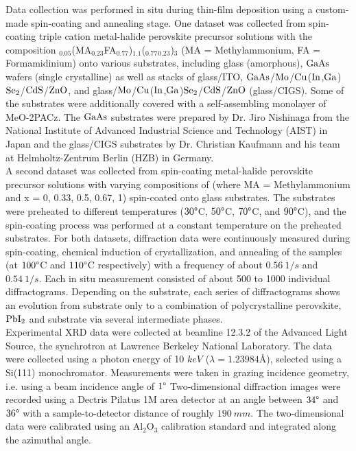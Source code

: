 Data collection was performed in situ during thin-film deposition using a custom-made spin-coating and annealing stage. One dataset was collected from spin-coating triple cation metal-halide perovskite precursor solutions with the composition 
$_{0.05}$(MA$_{0.23}$FA$_{0.77}$)$_{1.1}$($_{0.77}$$_{0.23}$)$_{3}$ (MA = Methylammonium, FA = Formamidinium) onto various substrates, including glass (amorphous), $\ce{GaAs}$ wafers (single crystalline) as well as stacks of glass/ITO, $\ce{GaAs}$/$\ce{Mo}$/$\ce{Cu}$($\ce{In}$,$\ce{Ga}$)$\ce{Se2}$/$\ce{CdS}$/$\ce{ZnO}$, and glass/$\ce{Mo}$/$\ce{Cu}$($\ce{In}$,$\ce{Ga}$)$\ce{Se2}$/$\ce{CdS}$/$\ce{ZnO}$ (glass/CIGS). Some of the substrates were additionally covered with a self-assembling monolayer of MeO-2PACz. The $\ce{GaAs}$ substrates were prepared by Dr. Jiro Nishinaga from the National Institute of Advanced Industrial Science and Technology (AIST) in Japan and the glass/CIGS substrates by Dr. Christian Kaufmann and his team at Helmholtz-Zentrum Berlin (HZB) in Germany. \\

A second dataset was collected from spin-coating metal-halide perovskite precursor solutions with varying compositions of  (where MA = Methylammonium and x = 0, 0.33, 0.5, 0.67, 1) spin-coated onto glass substrates. The substrates were preheated to different temperatures ($30\degree $C, $50\degree $C, $70\degree $C, and $90\degree $C), and the spin-coating process was performed at a constant temperature on the preheated substrates. For both datasets, diffraction data were continuously measured during spin-coating, chemical induction of crystallization, and annealing of the samples (at $100\degree$C and $110\degree$C respectively) with a frequency of about $0.56 
 \ 1/\si{s}$ and $0.54 \ 1/\si{s}$. Each in situ measurement consisted of about 500 to 1000 individual diffractograms. Depending on the substrate, each series of diffractograms shows an evolution from substrate only to a combination of polycrystalline perovskite, $\ce{PbI2}$ and substrate via several intermediate phases. \\

Experimental XRD data were collected at beamline 12.3.2 of the Advanced Light Source, the synchrotron at Lawrence Berkeley National Laboratory. The data were collected using a photon energy of 10 $\si{keV}$ ($\lambda = 1.23984 \text{\AA}$), selected using a Si(111) monochromator. Measurements were taken in grazing incidence geometry, i.e. using a beam incidence angle of $1\degree$ Two-dimensional diffraction images were recorded using a Dectris Pilatus 1M area detector at an angle between $34\degree$ and $36\degree$ with a sample-to-detector distance of roughly $190 \ \si{mm}$. The two-dimensional data were calibrated using an Al$_{2}$O$_{3}$ calibration standard and integrated along the azimuthal angle. \\


